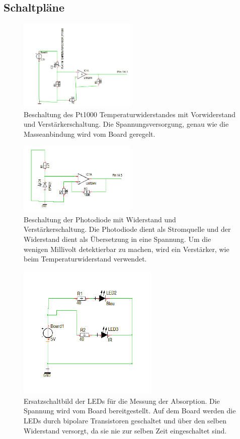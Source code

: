 \documentclass[12pt,a4paper,titlepage,headinclude,bibtotoc]{scrartcl}
\numberwithin{equation}{subsection}
\begin{document}
\subsection{Schaltpläne}
\begin{figure}[!h]
\centering
\includegraphics[width=0.5\textwidth]{Fotos/PT1000Schaltung.png}
\caption{Beschaltung des Pt1000 Temperaturwiderstandes mit Vorwiderstand und Verstärkerschaltung. Die Spannungsversorgung, genau wie die Masseanbindung wird vom Board geregelt.}
\label{fig:PT1000Schaltung}
\end{figure}
\begin{figure}[!h]
\centering
\includegraphics[width=0.5\textwidth]{Fotos/PhotodiodeSchaltung.png}
\caption{Beschaltung der Photodiode mit Widerstand und Verstärkerschaltung. Die Photodiode dient als Stromquelle und der Widerstand dient als Übersetzung in eine Spannung. Um die wenigen Millivolt detektierbar zu machen, wird ein Verstärker, wie beim Temperaturwiderstand verwendet.}
\label{fig:PhotodiodeSchaltung}
\end{figure}
\begin{figure}[!h]
\centering
\includegraphics[width=0.6\textwidth]{Fotos/LEDSchaltung.png}
\caption{Ersatzschaltbild der LEDs für die Messung der Absorption. Die Spannung wird vom Board bereitgestellt. Auf dem Board werden die LEDs durch bipolare Transistoren geschaltet und über den selben Widerstand versorgt, da sie nie zur selben Zeit eingeschaltet sind.}
\label{fig:LEDSchaltung}
\end{figure}
\end{document}

